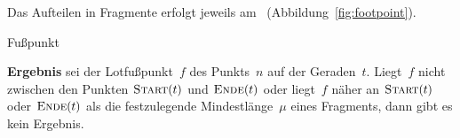 \documentclass[../main/thesis.tex]{subfiles}
\begin{document}



\noindent
Das Aufteilen in Fragmente erfolgt jeweils am ~(Abbildung~\ref{fig:footpoint}).

\begin{algorithmhere}{Fußpunkt}
\label{alg:Fusspunkt}
\begin{algorithmic}
	\State \textbf{Ergebnis} sei der Lotfußpunkt~$f$ des Punkts~$n$ auf der Geraden~$t$. Liegt~$f$ nicht zwischen den Punkten $\textproc{Start}(t)$ und $\textproc{Ende}(t)$ oder liegt~$f$ näher an $\textproc{Start}(t)$ oder $\textproc{Ende}(t)$ als die festzulegende Mindestlänge~$\mu$ eines Fragments, dann gibt es kein Ergebnis.
\EndFunction
\end{algorithmic}
\end{algorithmhere}

\end{document}
